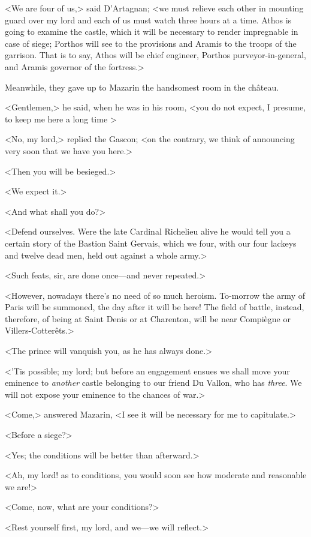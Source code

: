 <We are four of us,> said D'Artagnan; <we must relieve each other in mounting guard over my lord and each of us must watch three hours at a time. Athos is going to examine the castle, which it will be necessary to render impregnable in case of siege; Porthos will see to the provisions and Aramis to the troops of the garrison. That is to say, Athos will be chief engineer, Porthos purveyor-in-general, and Aramis governor of the fortress.>

Meanwhile, they gave up to Mazarin the handsomest room in the château.

<Gentlemen,> he said, when he was in his room, <you do not expect, I presume, to keep me here a long time >

<No, my lord,> replied the Gascon; <on the contrary, we think of announcing very soon that we have you here.>

<Then you will be besieged.>

<We expect it.>

<And what shall you do?>

<Defend ourselves. Were the late Cardinal Richelieu alive he would tell you a certain story of the Bastion Saint Gervais, which we four, with our four lackeys and twelve dead men, held out against a whole army.>

<Such feats, sir, are done once—and never repeated.>

<However, nowadays there's no need of so much heroism. To-morrow the army of Paris will be summoned, the day after it will be here! The field of battle, instead, therefore, of being at Saint Denis or at Charenton, will be near Compiègne or Villers-Cotterêts.>

<The prince will vanquish you, as he has always done.>

<'Tis possible; my lord; but before an engagement ensues we shall move your eminence to \emph{another} castle belonging to our friend Du Vallon, who has \emph{three}. We will not expose your eminence to the chances of war.>

<Come,> answered Mazarin, <I see it will be necessary for me to capitulate.>

<Before a siege?>

<Yes; the conditions will be better than afterward.>

<Ah, my lord! as to conditions, you would soon see how moderate and reasonable we are!>

<Come, now, what are your conditions?>

<Rest yourself first, my lord, and we—we will reflect.>

